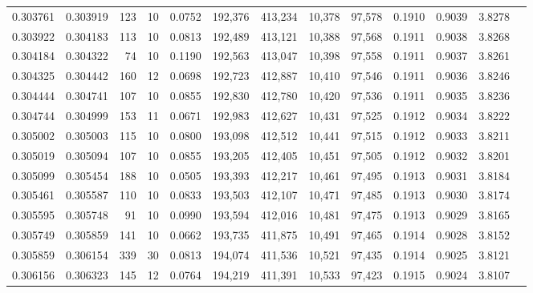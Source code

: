 \begin{tabular}{rrrrrrrrrrrrr}
0.303761 & 0.303919 &   123 &  10 &                                     0.0752 & 192,376 & 413,234 &  10,378 &  97,578 & 0.1910 & 0.9039 & 3.8278 \\
0.303922 & 0.304183 &   113 &  10 &                                     0.0813 & 192,489 & 413,121 &  10,388 &  97,568 & 0.1911 & 0.9038 & 3.8268 \\
0.304184 & 0.304322 &    74 &  10 &                                     0.1190 & 192,563 & 413,047 &  10,398 &  97,558 & 0.1911 & 0.9037 & 3.8261 \\
0.304325 & 0.304442 &   160 &  12 &                                     0.0698 & 192,723 & 412,887 &  10,410 &  97,546 & 0.1911 & 0.9036 & 3.8246 \\
0.304444 & 0.304741 &   107 &  10 &                                     0.0855 & 192,830 & 412,780 &  10,420 &  97,536 & 0.1911 & 0.9035 & 3.8236 \\
0.304744 & 0.304999 &   153 &  11 &                                     0.0671 & 192,983 & 412,627 &  10,431 &  97,525 & 0.1912 & 0.9034 & 3.8222 \\
0.305002 & 0.305003 &   115 &  10 &                                     0.0800 & 193,098 & 412,512 &  10,441 &  97,515 & 0.1912 & 0.9033 & 3.8211 \\
0.305019 & 0.305094 &   107 &  10 &                                     0.0855 & 193,205 & 412,405 &  10,451 &  97,505 & 0.1912 & 0.9032 & 3.8201 \\
0.305099 & 0.305454 &   188 &  10 &                                     0.0505 & 193,393 & 412,217 &  10,461 &  97,495 & 0.1913 & 0.9031 & 3.8184 \\
0.305461 & 0.305587 &   110 &  10 &                                     0.0833 & 193,503 & 412,107 &  10,471 &  97,485 & 0.1913 & 0.9030 & 3.8174 \\
0.305595 & 0.305748 &    91 &  10 &                                     0.0990 & 193,594 & 412,016 &  10,481 &  97,475 & 0.1913 & 0.9029 & 3.8165 \\
0.305749 & 0.305859 &   141 &  10 &                                     0.0662 & 193,735 & 411,875 &  10,491 &  97,465 & 0.1914 & 0.9028 & 3.8152 \\
0.305859 & 0.306154 &   339 &  30 &                                     0.0813 & 194,074 & 411,536 &  10,521 &  97,435 & 0.1914 & 0.9025 & 3.8121 \\
0.306156 & 0.306323 &   145 &  12 &                                     0.0764 & 194,219 & 411,391 &  10,533 &  97,423 & 0.1915 & 0.9024 & 3.8107 \\

\end{tabular}
